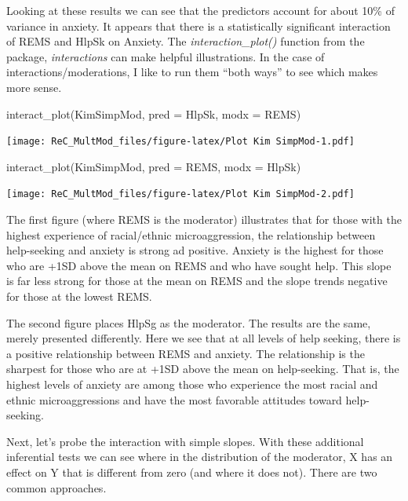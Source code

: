 \documentclass[
]{book}
\newenvironment{Shaded}{\begin{snugshade}}{\end{snugshade}}
\newcommand{\AttributeTok}[1]{\textcolor[rgb]{0.77,0.63,0.00}{#1}}
\newcommand{\FunctionTok}[1]{\textcolor[rgb]{0.00,0.00,0.00}{#1}}
\newcommand{\NormalTok}[1]{#1}
\begin{document}
Looking at these results we can see that the predictors account for about 10\% of variance in anxiety. It appears that there is a statistically significant interaction of REMS and HlpSk on Anxiety. The \emph{interaction\_plot()} function from the package, \emph{interactions} can make helpful illustrations. In the case of interactions/moderations, I like to run them ``both ways'' to see which makes more sense.

\begin{Shaded}
\begin{Highlighting}[]
\FunctionTok{interact\_plot}\NormalTok{(KimSimpMod, }\AttributeTok{pred =}\NormalTok{ HlpSk, }\AttributeTok{modx =}\NormalTok{ REMS)}
\end{Highlighting}
\end{Shaded}

\texttt{[image: ReC\_MultMod\_files/figure-latex/Plot Kim SimpMod-1.pdf]}

\begin{Shaded}
\begin{Highlighting}[]
\FunctionTok{interact\_plot}\NormalTok{(KimSimpMod, }\AttributeTok{pred =}\NormalTok{ REMS, }\AttributeTok{modx =}\NormalTok{ HlpSk)}
\end{Highlighting}
\end{Shaded}

\texttt{[image: ReC\_MultMod\_files/figure-latex/Plot Kim SimpMod-2.pdf]}

The first figure (where REMS is the moderator) illustrates that for those with the highest experience of racial/ethnic microaggression, the relationship between help-seeking and anxiety is strong ad positive. Anxiety is the highest for those who are +1SD above the mean on REMS and who have sought help. This slope is far less strong for those at the mean on REMS and the slope trends negative for those at the lowest REMS.

The second figure places HlpSg as the moderator. The results are the same, merely presented differently. Here we see that at all levels of help seeking, there is a positive relationship between REMS and anxiety. The relationship is the sharpest for those who are at +1SD above the mean on help-seeking. That is, the highest levels of anxiety are among those who experience the most racial and ethnic microaggressions and have the most favorable attitudes toward help-seeking.

Next, let's probe the interaction with simple slopes. With these additional inferential tests we can see where in the distribution of the moderator, X has an effect on Y that is different from zero (and where it does not). There are two common approaches.
\end{document}
